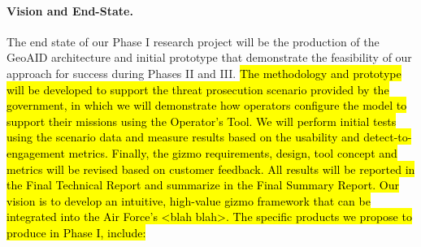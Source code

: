 \documentclass{sbir}
\begin{document}
\paragraph{Vision and End-State.} The end state of our Phase I research project will be the production of the GeoAID architecture and initial prototype that demonstrate the feasibility of our approach for success during Phases II and III. \hl{The methodology and prototype will be developed to support  the threat prosecution scenario provided by the government, in which we will demonstrate how operators configure the model to support their missions using the Operator's Tool. We will perform initial tests using the scenario data and measure results based on the usability and detect-to-engagement metrics. Finally, the \hl{gizmo} requirements, design, tool concept and metrics will be revised based on customer feedback. All results will be reported in the Final Technical Report and summarize in the Final Summary Report.
Our vision is to develop an intuitive, high-value \hl{gizmo} framework that can be integrated into the Air Force's  \hl{<blah blah>}. The specific products we propose to produce in Phase I, include:}
\end{document}
